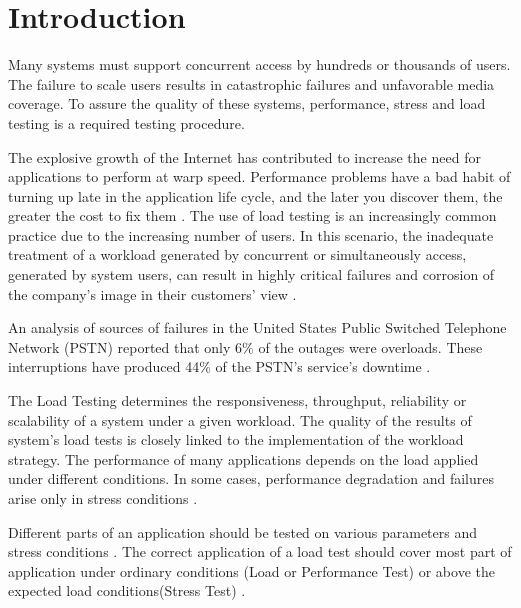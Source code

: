 \section{Introduction}

Many systems must support concurrent
access by hundreds or thousands of users. The failure to scale users results in catastrophic failures and unfavorable media coverage\cite{Jiang2010}. To assure the quality of these systems, performance, stress and load testing is a required testing procedure\cite{Jiang2009}. 

The explosive growth of the Internet has contributed to  increase the need for applications to perform at warp speed. Performance problems have a bad habit of turning up late in the application life cycle, and the later you discover them, the greater the cost to fix them \cite{Molyneaux2009}.
%
%
%
% 
%
The use of load testing is an increasingly common practice due to the increasing number of users. In this scenario, the inadequate treatment of a workload generated by concurrent or simultaneously access, generated by system users, can result in highly critical failures and corrosion of the company's image in their customers' view \cite{Draheim2006b} \cite{Jiang2010}. 
%
%

An analysis of sources of failures in the United States Public Switched Telephone Network (PSTN) reported that only 6\% of the outages were overloads. These interruptions have produced  44\% of the PSTN's service's downtime \cite{Kuhn1997}. 

The Load Testing determines the responsiveness, throughput, reliability or scalability of a system under a given workload. The quality of the results of system's load tests is closely linked to the implementation of the workload strategy. The performance of many applications depends on the load applied under different conditions. In some cases, performance degradation and failures arise only in stress conditions \cite{Garousi2010} \cite{Jiang2010}.


Different parts of an application should be tested on various parameters and stress conditions \cite{Babbar2011}. The correct application of a load test should cover most part of application under ordinary conditions (Load or Performance Test) or above the expected load conditions(Stress Test) \cite{Draheim2006b} \cite{Luiz2011} \cite{Fe2004}.

